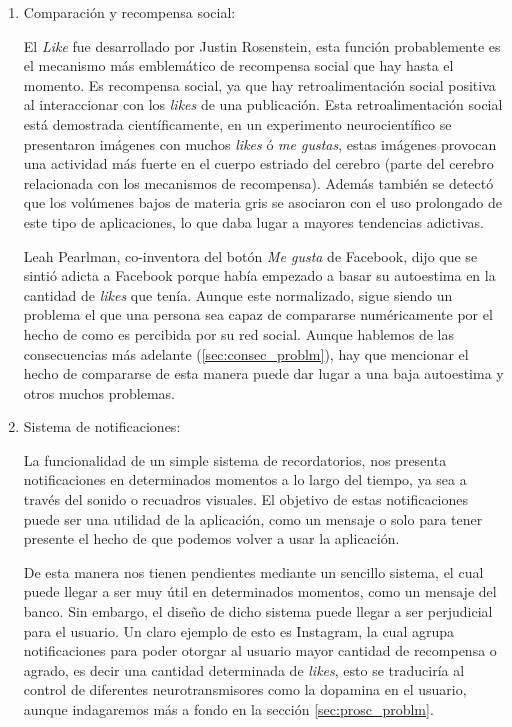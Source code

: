 \begin{enumerate}
    \item Comparación y recompensa social:

    El \textit{Like} fue desarrollado por Justin Rosenstein, esta función probablemente es el mecanismo más emblemático de recompensa social que hay hasta el momento. Es recompensa social, ya que hay retroalimentación social positiva al interaccionar con los \textit{likes} de una publicación. Esta retroalimentación social está demostrada científicamente, en un experimento neurocientífico se presentaron imágenes con muchos \textit{likes} ó \textit{me gustas}, estas imágenes provocan una actividad más fuerte en el cuerpo estriado del cerebro (parte del cerebro relacionada con los mecanismos de recompensa). Además también se detectó que los volúmenes bajos de materia gris se asociaron con el uso prolongado de este tipo de aplicaciones, lo que daba lugar a mayores tendencias adictivas. \cite{MONTAG2017221,sherman2018peer}

    Leah Pearlman, co-inventora del botón \textit{Me gusta} de Facebook, dijo que se sintió adicta a Facebook porque había empezado a basar su autoestima en la cantidad de \textit{likes} que tenía. \cite{Social-Deliberately} Aunque este normalizado, sigue siendo un problema el que una persona sea capaz de compararse numéricamente por el hecho de como es percibida por su red social. Aunque hablemos de las consecuencias más adelante (\ref{sec:consec_problm}), hay que mencionar el hecho de compararse de esta manera puede dar lugar a una baja autoestima y otros muchos problemas.

    \item Sistema de notificaciones:

    La funcionalidad de un simple sistema de recordatorios, nos presenta notificaciones en determinados momentos a lo largo del tiempo, ya sea a través del sonido o recuadros visuales. El objetivo de estas notificaciones puede ser una utilidad de la aplicación, como un mensaje o solo para tener presente el hecho de que podemos volver a usar la aplicación.
    
    De esta manera nos tienen pendientes mediante un sencillo sistema, el cual puede llegar a ser muy útil en determinados momentos, como un mensaje del banco. Sin embargo, el diseño de dicho sistema puede llegar a ser perjudicial para el usuario. Un claro ejemplo de esto es Instagram, la cual agrupa notificaciones para poder otorgar al usuario mayor cantidad de recompensa o agrado, es decir una cantidad determinada de \textit{likes}, esto se traduciría al control de diferentes neurotransmisores como la dopamina en el usuario, aunque indagaremos más a fondo en la sección \ref{sec:prosc_problm}.

\end{enumerate}


